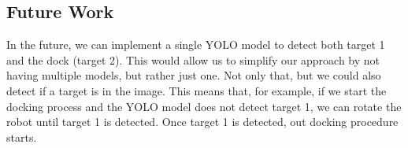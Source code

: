 \subsection{Future Work}
In the future, we can implement a single YOLO model to detect both target 1 and the dock (target 2). This would allow us to simplify our approach by not having multiple models, but rather just one. Not only that, but we could also detect if a target is in the image. This means that, for example, if we start the docking process and the YOLO model does not detect target 1, we can rotate the robot until target 1 is detected. Once target 1 is detected, out docking procedure starts.
